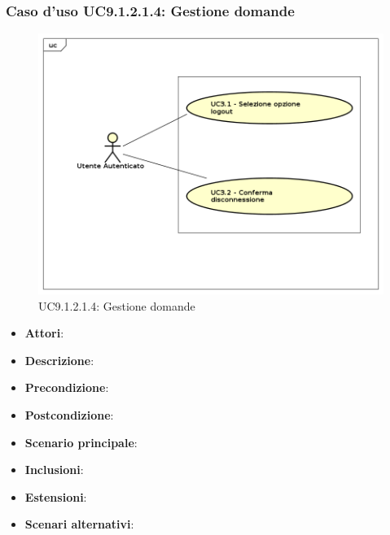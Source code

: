					\subsubsection{Caso d'uso UC9.1.2.1.4: Gestione domande}
					\label{UC9.1.2.1.4}
					\begin{figure}[h]
						\centering
					\includegraphics[scale=0.7,keepaspectratio]{UML/UC9.png}
						\caption{UC9.1.2.1.4: Gestione domande}
					\end{figure}
					\FloatBarrier
					\begin{itemize}
						\item \textbf{Attori}: 
						\item \textbf{Descrizione}: 
						\item \textbf{Precondizione}: 
						\item \textbf{Postcondizione}: 
						\item \textbf{Scenario principale}:
						\item \textbf{Inclusioni}:
						\item \textbf{Estensioni}:
						\item \textbf{Scenari alternativi}:
					\end{itemize}
					

